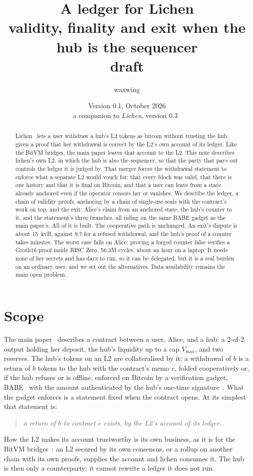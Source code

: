\documentclass[11pt]{article}
\title{\textbf{A ledger for Lichen}\\validity, finality and exit when the hub is the sequencer\\[2pt]\large draft}
\author{waxwing}
\date{Version 0.1, October 2026\\[2pt]\small a companion to \emph{Lichen}, version 0.3~\cite{lichen}}
\newcommand{\vmax}{V_{\max}}
\begin{document}
\maketitle

\begin{abstract}
Lichen~\cite{lichen} lets a user withdraw a hub's L2 tokens as bitcoin
without trusting the hub, given a proof that her withdrawal is correct
by the L2's own account of its ledger. Like the BitVM bridges, the main
paper leaves that account to the L2. This note describes lichen's own
L2, in which the hub is also the sequencer, so that the party that pays
out controls the ledger it is judged by. That merger forces the
withdrawal statement to enforce what a separate L2 would vouch for: that
every block was valid, that there is one history and that it is final on
Bitcoin, and that a user can leave from a state already anchored even if
the operator censors her or vanishes. We describe the ledger, a chain of
validity proofs, anchoring by a chain of single-use seals with the
contract's work on top, and the exit: Alice's claim from an anchored
state, the hub's counter to it, and the statement's three branches, all
riding on the same BABE gadget as the main paper's. All of it is built.
The cooperative path is unchanged. An exit's dispute is about 15~kvB,
against 9.7 for a refused withdrawal, and the hub's proof of a counter
takes minutes. The worst case falls on Alice:
proving a forged counter false verifies a Groth16 proof inside RISC
Zero, 56.3M cycles, about an hour on a laptop. It needs none of her
secrets and has days to run, so it can be delegated, but it is a real
burden on an ordinary user, and we set out the alternatives. Data
availability remains the main open problem.
\end{abstract}

\tableofcontents

\section{Scope}
\label{sec:scope}

The main paper~\cite{lichen} describes a contract between a user, Alice,
and a hub: a 2-of-2 output holding her deposit, the hub's liquidity up to
a cap $\vmax$, and two reserves. The hub's tokens on an L2 are
collateralised by it; a withdrawal of $b$ is a return of $b$ tokens to
the hub with the contract's memo $c$, folded cooperatively or, if the hub
refuses or is offline, enforced on Bitcoin by a verification gadget,
BABE~\cite{babe} with the amount authenticated by the hub's one-time
signature~\cite{lichenbabe}. What the gadget enforces is a statement
fixed when the contract opens. At its simplest that statement is:
\begin{quote}
\emph{a return of $b$ to contract $c$ exists, by the L2's account of its
ledger.}
\end{quote}
How the L2 makes its account trustworthy is its own business, as it is
for the BitVM bridges~\cite{bitvm2usenix}: an L2 secured by its own
consensus, or a rollup on another chain with its own proofs, supplies
the account and lichen consumes it. The hub is then only a counterparty;
it cannot rewrite a ledger it does not run.
\end{document}
